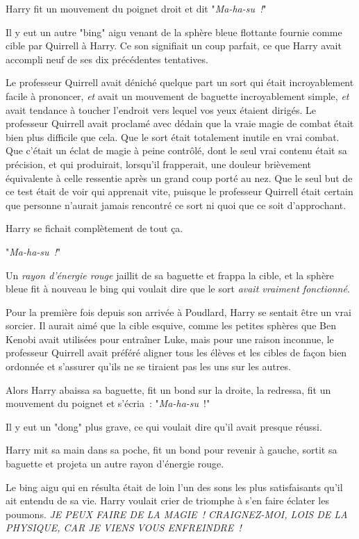 \later

Harry fit un mouvement du poignet droit et dit "\emph{Ma-ha-su~!}"

Il y eut un autre "bing" aigu venant de la sphère bleue flottante fournie comme cible par Quirrell à Harry. Ce son signifiait un coup parfait, ce que Harry avait accompli neuf de ses dix précédentes tentatives.

Le professeur Quirrell avait déniché quelque part un sort qui était incroyablement facile à prononcer, \emph{et} avait un mouvement de baguette incroyablement simple, \emph{et} avait tendance à toucher l'endroit vers lequel vos yeux étaient dirigés. Le professeur Quirrell avait proclamé avec dédain que la vraie magie de combat était bien plus difficile que cela. Que le sort était totalement inutile en vrai combat. Que c'était un éclat de magie à peine contrôlé, dont le seul vrai contenu était sa précision, et qui produirait, lorsqu'il frapperait, une douleur brièvement équivalente à celle ressentie après un grand coup porté au nez. Que le seul but de ce test était de voir qui apprenait vite, puisque le professeur Quirrell était certain que personne n'aurait jamais rencontré ce sort ni quoi que ce soit d'approchant.

Harry se fichait complètement de tout ça.

"\emph{Ma-ha-su~!}"

Un \emph{rayon d'énergie rouge} jaillit de sa baguette et frappa la cible, et la sphère bleue fit à nouveau le bing qui voulait dire que le sort \emph{avait vraiment fonctionné}.

Pour la première fois depuis son arrivée à Poudlard, Harry se sentait être un vrai sorcier. Il aurait aimé que la cible esquive, comme les petites sphères que Ben Kenobi avait utilisées pour entraîner Luke, mais pour une raison inconnue, le professeur Quirrell avait préféré aligner tous les élèves et les cibles de façon bien ordonnée et s'assurer qu'ils ne se tiraient pas les uns sur les autres.

Alors Harry abaissa sa baguette, fit un bond sur la droite, la redressa, fit un mouvement du poignet et s'écria~: "\emph{Ma-ha-su}~!"

Il y eut un "dong" plus grave, ce qui voulait dire qu'il avait presque réussi.

Harry mit sa main dans sa poche, fit un bond pour revenir à gauche, sortit sa baguette et projeta un autre rayon d'énergie rouge.

Le bing aigu qui en résulta était de loin l'un des sons les plus satisfaisants qu'il ait entendu de sa vie. Harry voulait crier de triomphe à s'en faire éclater les poumons. \emph{JE PEUX FAIRE DE LA MAGIE~! CRAIGNEZ-MOI, LOIS DE LA PHYSIQUE, CAR JE VIENS VOUS ENFREINDRE~!}

